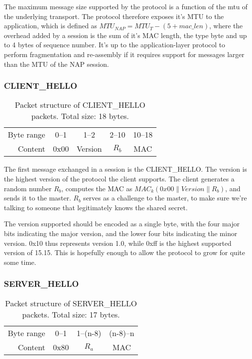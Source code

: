 The maximum message size supported by the protocol is a function of the \gls{mtu} of the underlying transport. The protocol therefore exposes it's MTU to the application, which is defined as \( MTU_{NAP} = MTU_{T} - (5 + mac\_len) \), where the overhead added by a session is the sum of it's MAC length, the type byte and up to 4 bytes of sequence number. It's up to the application-layer protocol to perform fragmentation and re-assembly if it requires support for messages larger than the MTU of the NAP session.


        \subsubsection{CLIENT\_HELLO}

\begin{table}[ht!]
\centering
    \begin{tabular}{r | c | c | c | c |}
    \cline{2-5}
    Byte range & 0--1 & 1--2 & 2--10 & 10--18 \\ \cline{2-5}
    Content & 0x00 & Version & \( R_b \) & MAC \\ \cline{2-5}
    \end{tabular}
    \caption{Packet structure of CLIENT\_HELLO packets. Total size: 18 bytes.}
\end{table}

The first message exchanged in a session is the CLIENT\_HELLO. The version is the highest version of the protocol the client supports. The client generates a random number \( R_b \), computes the MAC as \( MAC_k(0x00 \| Version \| R_b ) \), and sends it to the master. \( R_b \) serves as a challenge to the master, to make sure we're talking to someone that legitimately knows the shared secret.

The version supported should be encoded as a single byte, with the four major bits indicating the major version, and the lower four bits indicating the minor version. 0x10 thus represents version 1.0, while 0xff is the highest supported version of 15.15. This is hopefully enough to allow the protocol to grow for quite some time.


        \subsubsection{SERVER\_HELLO}

\begin{table}[ht!]
\centering
    \begin{tabular}{r | c | c | c |}
    \cline{2-4}
    Byte range & 0--1 & 1--(n-8) & (n-8)--n \\ \cline{2-4}
    Content & 0x80 & \( R_a \) & MAC \\ \cline{2-4}
    \end{tabular}
    \caption{Packet structure of SERVER\_HELLO packets. Total size: 17 bytes.}
\end{table}

